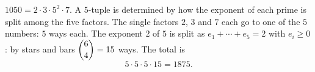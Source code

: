 $1050=2\cdot3\cdot5^2\cdot7$. A $5$-tuple is determined by how the exponent of each prime is split among the five factors. The single factors $2$, $3$ and $7$ each go to one of the $5$ numbers: $5$ ways each. The exponent $2$ of $5$ is split as $e_1+\cdots+e_5=2$ with $e_i\ge0$: by stars and bars $\dbinom{6}{4}=15$ ways. The total is
\[5\cdot5\cdot5\cdot15=\boxed{1875}.\]
